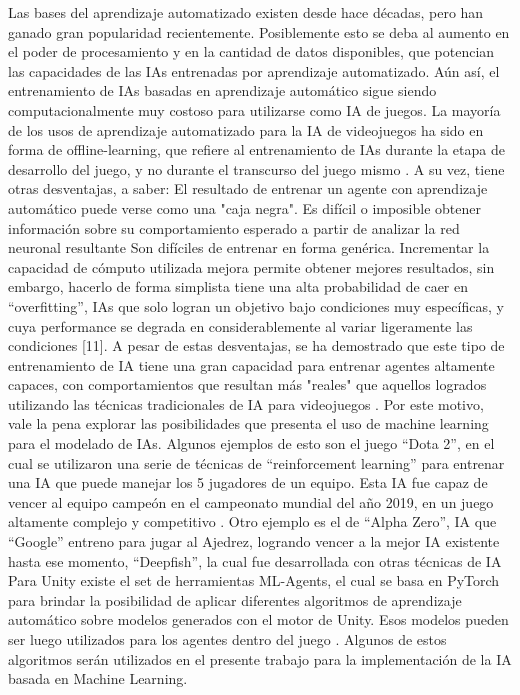 \documentclass{article}
\begin{document}
Las bases del aprendizaje automatizado existen desde hace décadas, pero han ganado gran popularidad recientemente. Posiblemente esto se deba al aumento en el poder de procesamiento y en la cantidad de datos disponibles, que potencian las capacidades de las IAs entrenadas por aprendizaje automatizado. Aún así, el entrenamiento de IAs basadas en aprendizaje automático sigue siendo computacionalmente muy costoso para utilizarse como IA de juegos. La mayoría de los usos de aprendizaje automatizado para la IA de videojuegos ha sido en forma de offline-learning, que refiere al entrenamiento de IAs durante la etapa de desarrollo del juego, y no durante el transcurso del juego mismo \cite{machine_learning_in_digital_games:_a_survey}.
A su vez, tiene otras desventajas, a saber:
El resultado de entrenar un agente con aprendizaje automático puede verse como una "caja negra". Es difícil o imposible obtener información sobre su comportamiento esperado a partir de analizar la red neuronal resultante \cite{deep_learning_black_box_problem}
Son difíciles de entrenar en forma genérica. Incrementar la capacidad de cómputo utilizada mejora permite obtener mejores resultados, sin embargo, hacerlo de forma simplista tiene una alta probabilidad de caer en “overfitting”, IAs que solo logran un objetivo bajo condiciones muy específicas, y cuya performance se degrada en considerablemente al variar ligeramente las condiciones [11].
A pesar de estas desventajas, se ha demostrado que este tipo de entrenamiento de IA tiene una gran capacidad para entrenar agentes altamente capaces, con comportamientos que resultan más "reales" que aquellos logrados utilizando las técnicas tradicionales de IA para videojuegos \cite{a_study_on_overfitting_in_deep_reinforcement_learning}. Por este motivo, vale la pena explorar las posibilidades que presenta el uso de machine learning para el modelado de IAs.
Algunos ejemplos de esto son el juego “Dota 2”, en el cual se utilizaron una serie de técnicas de “reinforcement learning” para entrenar una IA que puede manejar los 5 jugadores de un equipo. Esta IA fue capaz de vencer al equipo campeón en el campeonato mundial del año 2019, en un juego altamente complejo y competitivo \cite{dota_2_with_large_scale_deep_reinforcement_learning}. Otro ejemplo es el de “Alpha Zero”, IA que “Google” entreno para jugar al Ajedrez, logrando vencer a la mejor IA existente hasta ese momento, “Deepfish”, la cual fue desarrollada con otras técnicas de IA \cite{ai_in_human-computer_gaming}
Para Unity existe el set de herramientas ML-Agents, el cual se basa en PyTorch para brindar la posibilidad de aplicar diferentes algoritmos de aprendizaje automático sobre modelos generados con el motor de Unity. Esos modelos pueden ser luego utilizados para los agentes dentro del juego \cite{an_evaluation_of_the_unity_machine_learning_agents_toolkit}. Algunos de estos algoritmos serán utilizados en el presente trabajo para la implementación de la IA basada en Machine Learning.
\end{document}
